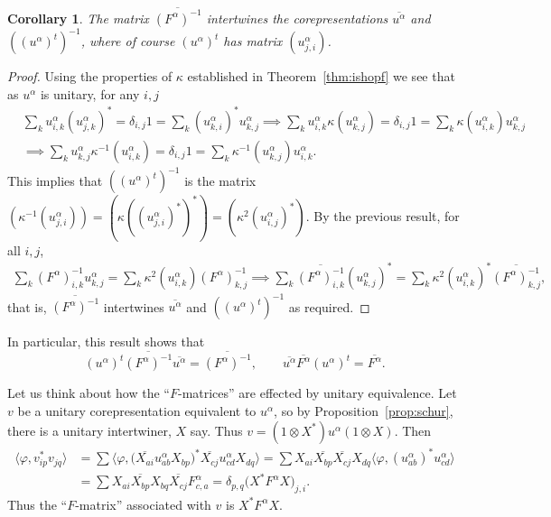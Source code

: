 \documentclass[twoside,a4paper,12pt]{article}
\theoremstyle{plain}
\newtheorem{corollary}[proposition]{Corollary}
\theoremstyle{definition}
\newcommand{\ip}[2]{\langle #1,#2 \rangle}
\begin{document}
\begin{corollary}\label{cor:fmatrixkappa}
The matrix $\overline{ (F^\alpha)^{-1} }$ intertwines the corepresentations
$\overline{u^\alpha}$ and $((u^\alpha)^t)^{-1}$, where of course $(u^\alpha)^t$
has matrix $(u^\alpha_{j,i})$.
\end{corollary}
\begin{proof}
Using the properties of $\kappa$ established in Theorem~\ref{thm:ishopf} we
see that as $u^\alpha$ is unitary, for any $i,j$
\begin{align*} & \sum_k u^\alpha_{i,k} (u^\alpha_{j,k})^*
= \delta_{i,j} 1 = \sum_k (u^\alpha_{k,i})^* u^\alpha_{k,j}
\implies \sum_k u^\alpha_{i,k} \kappa(u^\alpha_{k,j})
= \delta_{i,j} 1 = \sum_k \kappa(u^\alpha_{i,k}) u^\alpha_{k,j} \\
&\implies \sum_k u^\alpha_{k,j} \kappa^{-1}(u^\alpha_{i,k})
= \delta_{i,j} 1 = \sum_k \kappa^{-1}(u^\alpha_{k,j}) u^\alpha_{i,k}.
\end{align*}
This implies that $((u^\alpha)^t)^{-1}$ is the matrix
$(\kappa^{-1}(u^\alpha_{j,i})) = (\kappa((u^\alpha_{j,i})^*)^*)
= (\kappa^2( u^\alpha_{i,j} )^*)$.  By the previous result, for all $i,j$,
\begin{align*}
\sum_k (F^\alpha)^{-1}_{i,k} u^\alpha_{k,j}
= \sum_k \kappa^2(u^\alpha_{i,k}) (F^\alpha)^{-1}_{k,j}
\implies \sum_k \overline{(F^\alpha)^{-1}_{i,k}} (u^\alpha_{k,j})^*
= \sum_k \kappa^2(u^\alpha_{i,k})^* \overline{(F^\alpha)^{-1}_{k,j}},
\end{align*}
that is, $\overline{(F^\alpha)^{-1}}$ intertwines $\overline{u^\alpha}$ and
$((u^\alpha)^t)^{-1}$ as required.
\end{proof}

In particular, this result shows that
\[ (u^\alpha)^t \overline{ (F^\alpha)^{-1} } \overline{u^\alpha}
= \overline{ (F^\alpha)^{-1} }, \qquad 
\overline{u^\alpha} \overline{F^\alpha} (u^\alpha)^t = \overline{ F^\alpha }. \]

Let us think about how the ``$F$-matrices'' are effected by unitary equivalence.
Let $v$ be a unitary corepresentation equivalent to $u^\alpha$, so by
Proposition~\ref{prop:schur}, there is a unitary intertwiner, $X$ say.  Thus
$v = (1\otimes X^*)u^\alpha(1\otimes X)$.  Then
\begin{align*} \ip{\varphi}{v^*_{ip} v_{jq}}
&= \sum \ip{\varphi}{\big( \overline{X_{ai}} u^\alpha_{ab} X_{bp} \big)^*
\overline{X_{cj}} u^\alpha_{cd} X_{dq}}
= \sum X_{ai} \overline{X_{bp}} \overline{X_{cj}} X_{dq}
   \ip{\varphi}{(u^\alpha_{ab})^* u^\alpha_{cd}} \\
&= \sum X_{ai} \overline{X_{bp}} X_{bq} \overline{X_{cj}} F^\alpha_{c,a}
= \delta_{p,q} \big( X^* F^\alpha X \big)_{j,i}.
\end{align*}
Thus the ``$F$-matrix'' associated with $v$ is $X^* F^\alpha X$.
\end{document}
